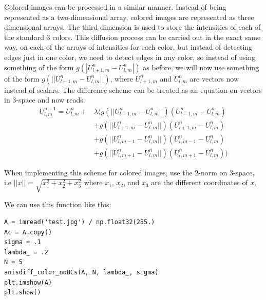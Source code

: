 Colored images can be processed in a similar manner.
Instead of being represented as a two-dimensional array, colored images are represented as three dimensional arrays.
The third dimension is used to store the intensities of each of the standard 3 colors.
This diffusion process can be carried out in the exact same way, on each of the arrays of intensities for each color, but instead of detecting edges just in one color, we need to detect edges in any color, so instead of using something of the form $g(|U_{l+1,m}^n - U_{l,m}^n|)$ as before, we will now use something of the form $g(||U_{l+1,m}^n - U_{l,m}^n||)$, where $U_{l+1,m}^n$ and $U_{l,m}^n$ are vectors now instead of scalars.
The difference scheme can be treated as an equation on vectors in 3-space and now reads:
\begin{align*}
U_{l,m}^{n+1} = U_{l,m}^n + & \lambda (g(||U_{l-1,m}^n - U_{l,m}^n||)(U_{l-1,m}^n - U_{l,m}^n) \\
					& + g(||U_{l+1,m}^n - U_{l,m}^n||)(U_{l+1,m}^n - U_{l,m}^n) \\
					& + g(||U_{l,m-1}^n - U_{l,m}^n||)(U_{l,m-1}^n - U_{l,m}^n) \\
					& + g(||U_{l,m+1}^n - U_{l,m}^n||)(U_{l,m+1}^n - U_{l,m}^n))
\end{align*}

When implementing this scheme for colored images, use the $2$-norm on 3-space, i.e $||x||=\sqrt{x_1^2+x_2^2+x_3^2}$ where $x_1$, $x_2$, and $x_3$ are the different coordinates of $x$.

We can use this function like this:
\begin{lstlisting}
A = imread('test.jpg') / np.float32(255.)
Ac = A.copy()
sigma = .1
lambda_ = .2
N = 5
anisdiff_color_noBCs(A, N, lambda_, sigma)
plt.imshow(A)
plt.show()
\end{lstlisting}

